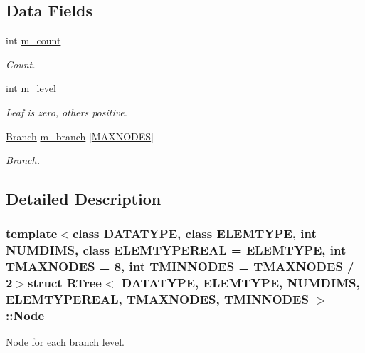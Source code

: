 \subsection*{Data Fields}
\begin{DoxyCompactItemize}
\item 
int \hyperlink{structRTree_1_1Node_ab2393bb1bfe7c8baa84ec4f205d990ed}{m\-\_\-count}
\begin{DoxyCompactList}\small\item\em Count. \end{DoxyCompactList}\item 
int \hyperlink{structRTree_1_1Node_a894162b955540567f0519bbbc33a6bf5}{m\-\_\-level}
\begin{DoxyCompactList}\small\item\em Leaf is zero, others positive. \end{DoxyCompactList}\item 
\hyperlink{structRTree_1_1Branch}{Branch} \hyperlink{structRTree_1_1Node_abc3b3eb3c889a004ca5a30628dd8775a}{m\-\_\-branch} \mbox{[}\hyperlink{classRTree_afaccb2e611f17ff46b623771ad7043d7ac05afe446df73fa67991e5199453a37f}{M\-A\-X\-N\-O\-D\-E\-S}\mbox{]}
\begin{DoxyCompactList}\small\item\em \hyperlink{structRTree_1_1Branch}{Branch}. \end{DoxyCompactList}\end{DoxyCompactItemize}


\subsection{Detailed Description}
\subsubsection*{template$<$class D\-A\-T\-A\-T\-Y\-P\-E, class E\-L\-E\-M\-T\-Y\-P\-E, int N\-U\-M\-D\-I\-M\-S, class E\-L\-E\-M\-T\-Y\-P\-E\-R\-E\-A\-L = E\-L\-E\-M\-T\-Y\-P\-E, int T\-M\-A\-X\-N\-O\-D\-E\-S = 8, int T\-M\-I\-N\-N\-O\-D\-E\-S = T\-M\-A\-X\-N\-O\-D\-E\-S / 2$>$struct R\-Tree$<$ D\-A\-T\-A\-T\-Y\-P\-E, E\-L\-E\-M\-T\-Y\-P\-E, N\-U\-M\-D\-I\-M\-S, E\-L\-E\-M\-T\-Y\-P\-E\-R\-E\-A\-L, T\-M\-A\-X\-N\-O\-D\-E\-S, T\-M\-I\-N\-N\-O\-D\-E\-S $>$\-::\-Node}

\hyperlink{structRTree_1_1Node}{Node} for each branch level. 

